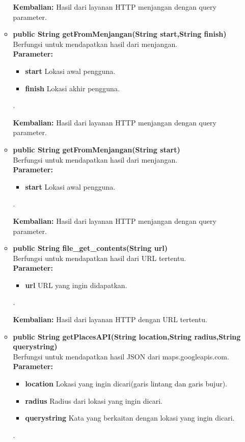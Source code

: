\begin{enumerate}
\begin{itemize}
		\textbf{Kembalian:}  Hasil dari layanan HTTP menjangan dengan query parameter.
		
		\item \textbf{public String getFromMenjangan(String start,String finish)}\\
		Berfungsi untuk mendapatkan hasil dari menjangan.\\
		\textbf{Parameter:}
				\begin{itemize}
					\item \textbf{start} Lokasi awal pengguna.
					\item \textbf{finish} Lokasi akhir pengguna.
				\end{itemize}.
				
		\textbf{Kembalian:}  Hasil dari layanan HTTP menjangan dengan query parameter.
		
		\item \textbf{public String getFromMenjangan(String start)}\\
		Berfungsi untuk mendapatkan hasil dari menjangan.\\
		\textbf{Parameter:}
				\begin{itemize}
					\item \textbf{start} Lokasi awal pengguna.
				\end{itemize}.
				
		\textbf{Kembalian:}  Hasil dari layanan HTTP menjangan dengan query parameter.
		
		\item \textbf{public String file\_get\_contents(String url)}\\
		Berfungsi untuk mendapatkan hasil dari URL tertentu.\\
		\textbf{Parameter:}
				\begin{itemize}
					\item \textbf{url} URL yang ingin didapatkan.
				\end{itemize}.
				
		\textbf{Kembalian:}  Hasil dari layanan HTTP dengan URL tertentu.
		
		\item \textbf{public String getPlacesAPI(String location,String radius,String querystring)}\\
		Berfungsi untuk mendapatkan hasil JSON dari maps.googleapis.com.\\
		\textbf{Parameter:}
				\begin{itemize}
					\item \textbf{location} Lokasi yang ingin dicari(garis lintang dan garis bujur).
					\item \textbf{radius} Radius dari lokasi yang ingin dicari.
					\item \textbf{querystring} Kata yang berkaitan dengan lokasi yang ingin dicari.
				\end{itemize}.
				

\end{itemize}
\end{enumerate}
